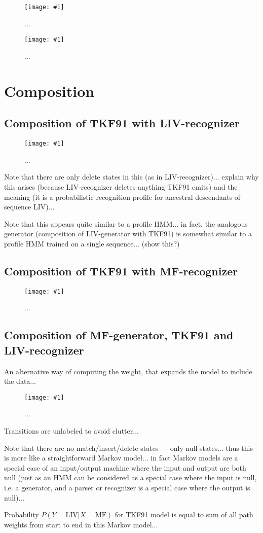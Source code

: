 \documentclass{article}
\newcommand{\figlabel}[1]{\label{Figures.#1}}
\newcommand{\easyfig}[3]{
\begin{figure}
\texttt{[image: \#1]}
\caption{ \figlabel{#2} #3}
\end{figure}}
\newcommand{\pdffig}[2]{\easyfig{#1.pdf}{#1}{#2}}
\begin{document}
\pdffig{tkf91}{...}

\pdffig{tkf91-labeled}{...}

\section{Composition}

\subsection{Composition of TKF91 with LIV-recognizer}

\pdffig{tkf91-liv}{...}

Note that there are only delete states in this (as in LIV-recognizer)...
explain why this arises (because LIV-recognizer deletes anything TKF91 emits)
and the meaning (it is a probabilistic recognition profile for ancestral descendants of sequence LIV)...

Note that this appears quite similar to a profile HMM...
in fact, the analogous generator (composition of LIV-generator with TKF91)
is somewhat similar to a profile HMM trained on a single sequence...
(show this?)

\subsection{Composition of TKF91 with MF-recognizer}

\pdffig{tkf91-mf}{...}

\subsection{Composition of MF-generator, TKF91 and LIV-recognizer}

An alternative way of computing the weight, that expands the model to include the data...

\pdffig{mf-tkf91-liv}{...}

Transitions are unlabeled to avoid clutter...

Note that there are no match/insert/delete states --- only null states...
thus this is more like a straightforward Markov model...
in fact Markov models are a special case of an input/output machine where the input and output are both null
(just as an HMM can be considered as a special case where the input is null, i.e. a generator,
and a parser or recognizer is a special case where the output is null)...

Probability $P(Y=\mbox{LIV}|X=\mbox{MF})$ for TKF91 model
is equal to sum of all path weights from start to end in this Markov model...
\end{document}
